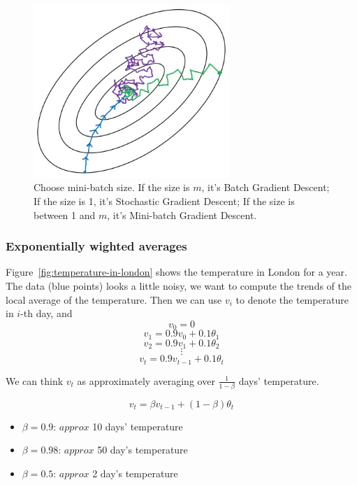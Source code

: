 \documentclass[UTF8]{article}
\begin{document}
\begin{figure}[htb]
    \centering
    \includegraphics[width=20em]{figures/choosing-mini-batch-size}
    \caption{Choose mini-batch size. If the size is $m$, it's Batch Gradient Descent; If the size
    is 1, it's Stochastic Gradient Descent; If the size is between 1 and $m$, it's Mini-batch
    Gradient Descent.}
    \label{fig:choosing-mini-batch-size}
\end{figure}

\subsubsection{Exponentially wighted averages}

Figure~\ref{fig:temperature-in-london} shows the temperature in London for a year. The data (blue
points) looks a little noisy, we want to compute the trends of the local average of the temperature.
Then we can use $v_i$ to denote the temperature in $i$-th day, and
$$v_0 = 0$$
$$v_1 = 0.9v_0 + 0.1\theta_1$$
$$v_2 = 0.9v_1 + 0.1\theta_2$$
$$\vdots$$
$$v_t = 0.9v_{t-1} + 0.1\theta_t$$

We can think $v_t$ as approximately averaging over $\displaystyle \frac{1}{1-\beta}$ days'
temperature.

$$ v_t = \beta v_{t-1} + (1-\beta)\theta_t $$

\begin{itemize}
    \item $\beta = 0.9$: $approx$ 10 days' temperature
    \item $\beta = 0.98$: $approx$ 50 day's temperature
    \item $\beta = 0.5$: $approx$ 2 day's temperature
\end{itemize}
\end{document}
